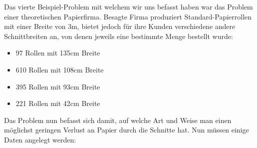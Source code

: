 Das vierte Beispiel-Problem mit welchem wir uns befasst haben war das Problem einer theoretischen Papierfirma. Besagte Firma produziert Standard-Papierrollen mit einer Breite von 3m, bietet jedoch für ihre Kunden verschiedene andere Schnittbreiten an, von denen jeweils eine bestimmte Menge bestellt wurde:
\begin{itemize}
\item 97 Rollen mit 135cm Breite
\item 610  Rollen mit 108cm Breite
\item 395  Rollen mit 93cm Breite
\item 221  Rollen mit 42cm Breite
\end{itemize}

Das Problem nun befasst sich damit, auf welche Art und Weise man einen möglichst geringen Verlust an Papier durch die Schnitte hat.
Nun müssen einige Daten angelegt werden:

